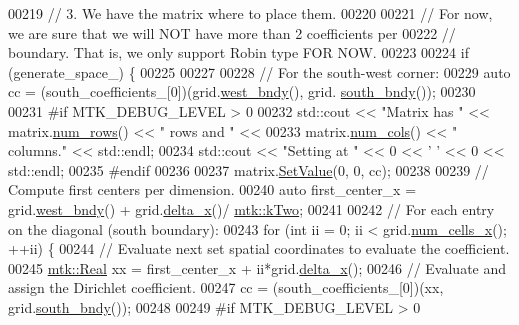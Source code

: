 \begin{DoxyCode}
00219   \textcolor{comment}{// 3. We have the matrix where to place them.}
00220 
00221   \textcolor{comment}{// For now, we are sure that we will NOT have more than 2 coefficients per}
00222   \textcolor{comment}{// boundary. That is, we only support Robin type FOR NOW.}
00223 
00224   \textcolor{keywordflow}{if} (generate\_space\_) \{
00225 
00227 
00228     \textcolor{comment}{// For the south-west corner:}
00229     \textcolor{keyword}{auto} cc = (south\_coefficients\_[0])(grid.\hyperlink{classmtk_1_1UniStgGrid2D_af2b1712387ded85edaf2b64617d3fc13}{west\_bndy}(), grid.
      \hyperlink{classmtk_1_1UniStgGrid2D_a1442eaf219f099d0ebf46a170fdebf92}{south\_bndy}());
00230 
00231 \textcolor{preprocessor}{    #if MTK\_DEBUG\_LEVEL > 0}
00232     std::cout << \textcolor{stringliteral}{"Matrix has "} << matrix.\hyperlink{classmtk_1_1DenseMatrix_a53f3afb3b6a8d21854458aaa9663cc74}{num\_rows}() << \textcolor{stringliteral}{" rows and "} <<
00233       matrix.\hyperlink{classmtk_1_1DenseMatrix_a41747502d468c6728a4be31501b16e0e}{num\_cols}() << \textcolor{stringliteral}{" columns."} << std::endl;
00234     std::cout << \textcolor{stringliteral}{"Setting at "} << 0 << \textcolor{charliteral}{' '} << 0 << std::endl;
00235 \textcolor{preprocessor}{    #endif}
00236 
00237     matrix.\hyperlink{classmtk_1_1DenseMatrix_a784ce5784109ac86bfb9d8562b334b13}{SetValue}(0, 0, cc);
00238 
00239     \textcolor{comment}{// Compute first centers per dimension.}
00240     \textcolor{keyword}{auto} first\_center\_x = grid.\hyperlink{classmtk_1_1UniStgGrid2D_af2b1712387ded85edaf2b64617d3fc13}{west\_bndy}() + grid.\hyperlink{classmtk_1_1UniStgGrid2D_aca4710004c4a7da6a9e8fd6ab32a691f}{delta\_x}()/
      \hyperlink{group__c01-roots_gaf39c2d851a2db744f4feb1c5ab3ec2cf}{mtk::kTwo};
00241 
00242     \textcolor{comment}{// For each entry on the diagonal (south boundary):}
00243     \textcolor{keywordflow}{for} (\textcolor{keywordtype}{int} ii = 0; ii < grid.\hyperlink{classmtk_1_1UniStgGrid2D_a2d182866a398aba8e4829590e85bf939}{num\_cells\_x}(); ++ii) \{
00244       \textcolor{comment}{// Evaluate next set spatial coordinates to evaluate the coefficient.}
00245       \hyperlink{group__c01-roots_gac080bbbf5cbb5502c9f00405f894857d}{mtk::Real} xx = first\_center\_x + ii*grid.\hyperlink{classmtk_1_1UniStgGrid2D_aca4710004c4a7da6a9e8fd6ab32a691f}{delta\_x}();
00246       \textcolor{comment}{// Evaluate and assign the Dirichlet coefficient.}
00247       cc = (south\_coefficients\_[0])(xx, grid.\hyperlink{classmtk_1_1UniStgGrid2D_a1442eaf219f099d0ebf46a170fdebf92}{south\_bndy}());
00248 
00249 \textcolor{preprocessor}{      #if MTK\_DEBUG\_LEVEL > 0}

\end{DoxyCode}
